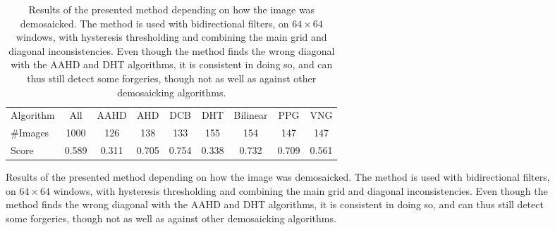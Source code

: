 \documentclass{ipol}
\begin{document}
\begin{table}[ht]
        \vspace{1em}

        \begin{subfigure}[b]{\linewidth}
                \centering
                \begin{tabular}{lcccccccc}
                        \toprule
                        \scriptsize Algorithm&All& AAHD & AHD & DCB & DHT & Bilinear & PPG & VNG\\
                        \scriptsize\#Images&1000&126&138&133&155&154&147&147\\
                        \midrule
                        \scriptsize Score&0.589&0.311&0.705&0.754&0.338&0.732&0.709&0.561\\
                        \bottomrule
                \end{tabular}
                \caption{Results of the presented method depending on how the image was demosaicked. The method is used with bidirectional filters, on $64\times64$ windows, with hysteresis thresholding and combining the main grid and diagonal inconsistencies. Even though the method finds the wrong diagonal with the AAHD and DHT algorithms, it is consistent in doing so, and can thus still detect some forgeries, though not as well as against other demosaicking algorithms.}
        \end{subfigure}


\end{table}
\end{document}

